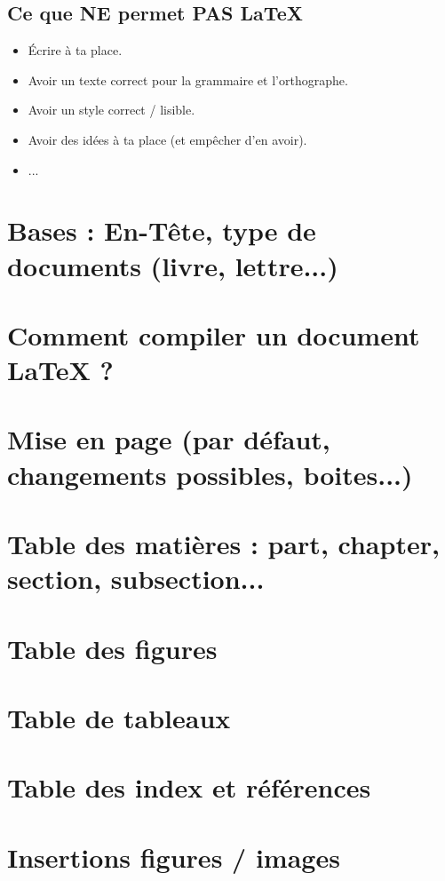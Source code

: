 \documentclass[11pt,twoside,a4paper]{article}
\begin{document}
\begin{landscape}
\begin{multicols}{2}
	\subsection{Ce que NE permet PAS \LaTeX}

	\begin{itemize}
		\item Écrire à ta place. 
		\item Avoir un texte correct pour la grammaire et l'orthographe. 
		\item Avoir un style correct / lisible. 
		\item Avoir des idées à ta place (et empêcher d'en avoir). 
		\item ...
	\end{itemize}
	
	
	\section{Bases : En-Tête, type de documents (livre, lettre...)}
	\section{Comment compiler un document LaTeX ?}
	\section{Mise en page (par défaut, changements possibles, boites...)} 
	\section{Table des matières : part, chapter, section, subsection...} 
	\section{Table des figures} 
	\section{Table de tableaux} 
	\section{Table des index et références} 
	\section{Insertions figures / images}  

\end{multicols}
\end{landscape}
\end{document}
